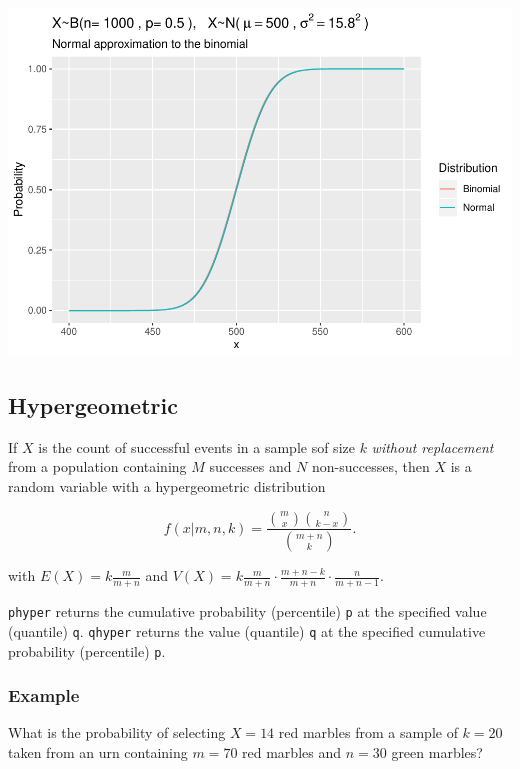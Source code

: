 \documentclass[
]{book}
\begin{document}
\includegraphics{data-sci_files/figure-latex/unnamed-chunk-17-1.pdf}

\hypertarget{hypergeometric}{%
\subsection{Hypergeometric}\label{hypergeometric}}

If \(X\) is the count of successful events in a sample sof size \(k\) \emph{without replacement} from a population containing \(M\) successes and \(N\) non-successes, then \(X\) is a random variable with a hypergeometric distribution

\[f(x|m,n,k) = \frac{{{m}\choose{x}}{{n}\choose{k-x}}}{{m+n}\choose{k}}.\]

with \(E(X)=k\frac{m}{m+n}\) and \(V(X) = k\frac{m}{m+n}\cdot\frac{m+n-k}{m+n}\cdot\frac{n}{m+n-1}\).

\texttt{phyper} returns the cumulative probability (percentile) \texttt{p} at the specified value (quantile) \texttt{q}. \texttt{qhyper} returns the value (quantile) \texttt{q} at the specified cumulative probability (percentile) \texttt{p}.

\hypertarget{example-9}{%
\subsubsection*{Example}\label{example-9}}

What is the probability of selecting \(X = 14\) red marbles from a sample of \(k = 20\) taken from an urn containing \(m = 70\) red marbles and \(n = 30\) green marbles?
\end{document}
